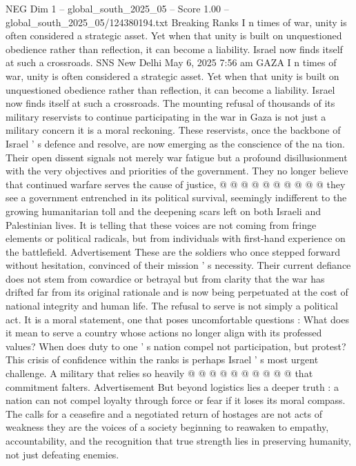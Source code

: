 \begin{textsample}{NEG Dim 1 – global\_south\_2025\_05 – Score 1.00 – global\_south\_2025\_05/124380194.txt}  \label{ex:f1_neg_170}
Breaking Ranks I n times of war, unity is often considered a strategic asset.
Yet when that unity is built on unquestioned obedience rather than reflection, it can become a liability.
Israel now finds itself at such a crossroads.
SNS New Delhi May 6, 2025 7:56 am GAZA I n times of war, unity is often considered a strategic asset.
Yet when that unity is built on unquestioned obedience rather than reflection, it can become a liability.
Israel now finds itself at such a crossroads.
The mounting refusal of thousands of its military reservists to continue participating in the war in Gaza is not just a military concern it is a moral reckoning.
These reservists, once the backbone of Israel ' s defence and resolve, are now emerging as the conscience of the na tion.
Their open dissent signals not merely war fatigue but a profound disillusionment with the very objectives and priorities of the government.
They no longer believe that continued warfare serves the cause of justice, @ @ @ @ @ @ @ @ @ @ they see a government entrenched in its political survival, seemingly indifferent to the growing humanitarian toll and the deepening scars left on both Israeli and Palestinian lives.
It is telling that these voices are not coming from fringe elements or political radicals, but from individuals with first-hand experience on the battlefield.
Advertisement These are the soldiers who once stepped forward without hesitation, convinced of their mission ' s necessity.
Their current defiance does not stem from cowardice or betrayal but from clarity that the war has drifted far from its original rationale and is now being perpetuated at the cost of national integrity and human life.
The refusal to serve is not simply a political act.
It is a moral statement, one that poses uncomfortable questions : What does it mean to serve a country whose actions no longer align with its professed values?
When does duty to one ' s nation compel not participation, but protest?
This crisis of confidence within the ranks is perhaps Israel ' s most urgent challenge.
A military that relies so heavily @ @ @ @ @ @ @ @ @ @ that commitment falters.
Advertisement But beyond logistics lies a deeper truth : a nation can not compel loyalty through force or fear if it loses its moral compass.
The calls for a ceasefire and a negotiated return of hostages are not acts of weakness they are the voices of a society beginning to reawaken to empathy, accountability, and the recognition that true strength lies in preserving humanity, not just defeating enemies.

\end{textsample}
